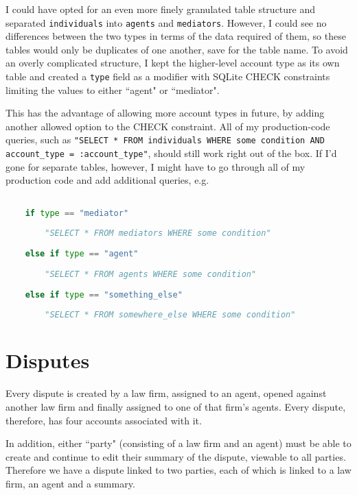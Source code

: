 I could have opted for an even more finely granulated table structure and separated \lstinline{individuals} into \lstinline{agents} and \lstinline{mediators}. However, I could see no differences between the two types in terms of the data required of them, so these tables would only be duplicates of one another, save for the table name. To avoid an overly complicated structure, I kept the higher-level account type as its own table and created a \lstinline{type} field as a modifier with SQLite CHECK constraints limiting the values to either ``agent" or ``mediator".

This has the advantage of allowing more account types in future, by adding another allowed option to the CHECK constraint. All of my production-code queries, such as \lstinline{"SELECT * FROM individuals WHERE some condition AND account_type = :account_type"}, should still work right out of the box. If I'd gone for separate tables, however, I might have to go through all of my production code and add additional queries, e.g.

\begin{lstlisting}[language=python]

    if type == "mediator"
    
        "SELECT * FROM mediators WHERE some condition"
    
    else if type == "agent"
    
        "SELECT * FROM agents WHERE some condition"
    
    else if type == "something_else"
    
        "SELECT * FROM somewhere_else WHERE some condition"

\end{lstlisting}

\section{Disputes}

Every dispute is created by a law firm, assigned to an agent, opened against another law firm and finally assigned to one of that firm's agents. Every dispute, therefore, has four accounts associated with it.

In addition, either ``party" (consisting of a law firm and an agent) must be able to create and continue to edit their summary of the dispute, viewable to all parties. Therefore we have a dispute linked to two parties, each of which is linked to a law firm, an agent and a summary.

